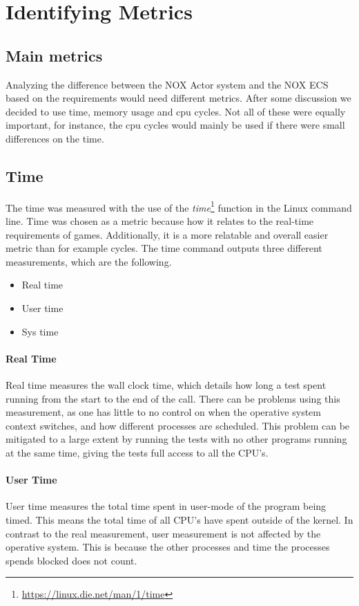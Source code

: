 \section{Identifying Metrics}

\subsection{Main metrics}
Analyzing the difference between the NOX Actor system and the NOX ECS based on the requirements would need different metrics.
After some discussion we decided to use time, memory usage and cpu cycles.
Not all of these were equally important, for instance, the cpu cycles would mainly be used if there were small differences on the time.

\subsection{Time}
The time was measured with the use of the \emph{time}\footnote{\url{https://linux.die.net/man/1/time}} function in the Linux command line.
Time was chosen as a metric because how it relates to the real-time requirements of games.
Additionally, it is a more relatable and overall easier metric than for example cycles.
The time command outputs three different measurements, which are the following\cite{stack_overflow_time_output}.

\begin{itemize}
    \item Real time
    \item User time
    \item Sys time
\end{itemize}

\paragraph{Real Time}
Real time measures the wall clock time, which details how long a test spent running from the start to the end of the call.
There can be problems using this measurement, as one has little to no control on when the operative system context switches, and how different processes are scheduled.
This problem can be mitigated to a large extent by running the tests with no other programs running at the same time, giving the tests full access to all the CPU's.

\paragraph{User Time}
User time measures the total time spent in user-mode of the program being timed.
This means the total time of all CPU's have spent outside of the kernel.
In contrast to the real measurement, user measurement is not affected by the operative system.
This is because the other processes and time the processes spends blocked does not count.


